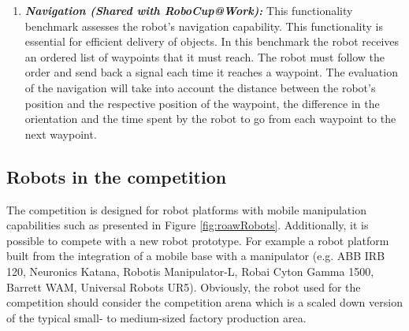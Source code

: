 \begin{enumerate}
	\item \textbf{\emph{Navigation (Shared with RoboCup@Work):}} This functionality benchmark assesses the robot's navigation capability. 
	This functionality is essential for efficient delivery of objects.
	In this benchmark the robot receives an ordered list of waypoints that it must reach. The robot must follow the order and send back a signal each time it reaches a waypoint. The evaluation of the navigation will take into account the distance between the robot's position and the respective position of the waypoint, the difference in the orientation and the time spent by the robot to go from each waypoint to the next waypoint.
	\end{enumerate}

\subsection{Robots in the \erlir competition}
The \erlir competition is designed for robot platforms with mobile manipulation capabilities such as presented in Figure \ref{fig:roawRobots}.
Additionally, it is possible to compete with a new robot prototype. 
For example a robot platform built from the integration of a mobile base with a manipulator (e.g. ABB IRB 120, Neuronics Katana, Robotis Manipulator-L, Robai Cyton Gamma 1500, Barrett WAM, Universal Robots UR5). 
Obviously, the robot used for the competition should consider the competition arena which is a scaled down version of the typical small- to medium-sized factory production area.

